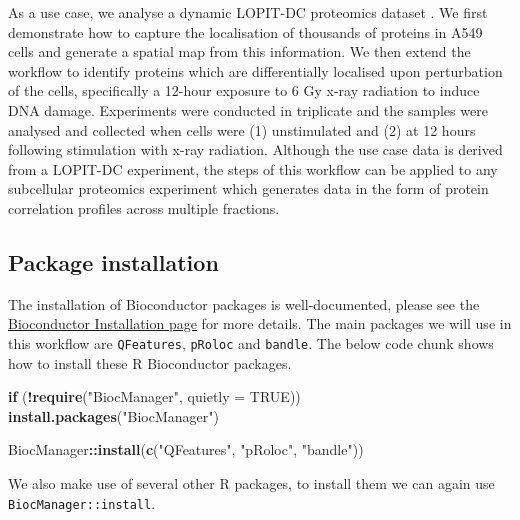 \documentclass[9pt,a4paper,]{extarticle}
\newenvironment{Shaded}{\begin{snugshade}}{\end{snugshade}}
\newcommand{\AttributeTok}[1]{\textcolor[rgb]{0.13,0.29,0.53}{#1}}
\newcommand{\ConstantTok}[1]{\textcolor[rgb]{0.56,0.35,0.01}{#1}}
\newcommand{\ControlFlowTok}[1]{\textcolor[rgb]{0.13,0.29,0.53}{\textbf{#1}}}
\newcommand{\FunctionTok}[1]{\textcolor[rgb]{0.13,0.29,0.53}{\textbf{#1}}}
\newcommand{\NormalTok}[1]{#1}
\newcommand{\SpecialCharTok}[1]{\textcolor[rgb]{0.81,0.36,0.00}{\textbf{#1}}}
\newcommand{\StringTok}[1]{\textcolor[rgb]{0.31,0.60,0.02}{#1}}
\begin{document}
As a use case, we analyse a dynamic LOPIT-DC proteomics dataset \citep{Christopher2025}.
We first demonstrate how to capture the localisation of thousands of proteins in
A549 cells and generate a spatial map from this information. We then extend
the workflow to identify proteins which are differentially localised upon perturbation
of the cells, specifically a 12-hour exposure to 6 Gy x-ray radiation to induce
DNA damage. Experiments were conducted in triplicate and the samples were analysed
and collected when cells were (1) unstimulated and (2) at 12 hours following
stimulation with x-ray radiation. Although the use case data is derived from a LOPIT-DC
experiment, the steps of this workflow can be applied to any subcellular proteomics
experiment which generates data in the form of protein correlation profiles
across multiple fractions.

\subsection{Package installation}\label{package-installation}

The installation of Bioconductor packages is well-documented, please see the
\href{http://bioconductor.org/install/}{Bioconductor Installation page} for more
details. The main packages we will use in this workflow are \texttt{QFeatures}, \texttt{pRoloc}
and \texttt{bandle}. The below code chunk shows how to install these R Bioconductor packages.

\begin{Shaded}
\begin{Highlighting}[]
\ControlFlowTok{if}\NormalTok{ (}\SpecialCharTok{!}\FunctionTok{require}\NormalTok{(}\StringTok{"BiocManager"}\NormalTok{, }\AttributeTok{quietly =} \ConstantTok{TRUE}\NormalTok{))}
    \FunctionTok{install.packages}\NormalTok{(}\StringTok{"BiocManager"}\NormalTok{)}

\NormalTok{BiocManager}\SpecialCharTok{::}\FunctionTok{install}\NormalTok{(}\FunctionTok{c}\NormalTok{(}\StringTok{"QFeatures"}\NormalTok{, }
                       \StringTok{"pRoloc"}\NormalTok{,}
                       \StringTok{"bandle"}\NormalTok{))}
\end{Highlighting}
\end{Shaded}

We also make use of several other R packages, to install them we can again
use \texttt{BiocManager::install}.
\end{document}
